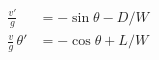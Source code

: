 \begin{align}
 \frac{v'}{g} & = - \sin\theta - D/W \\
 \frac{v}{g} \, \theta' & = - \cos\theta + L/W
 \end{align}
